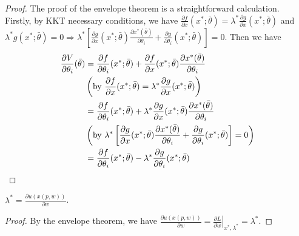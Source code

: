 \documentclass[11pt]{elegantbook}
\begin{document}
\begin{proof}
    The proof of the envelope theorem is a straightforward calculation.\\
    Firstly, by KKT necessary conditions, we have $\frac{\partial f}{\partial x}(x^*;\bar{\theta})=\lambda^* \frac{\partial g}{\partial x}(x^*;\bar{\theta})$ and $\lambda^* g(x^*;\bar{\theta})=0 \Rightarrow \lambda^*\left[\frac{\partial g}{\partial x}(x^*;\bar{\theta})\frac{\partial x^*(\bar{\theta})}{\partial \theta_i}+\frac{\partial g}{\partial \theta_i}(x^*;\bar{\theta})\right]=0$. Then we have
    \begin{equation}
        \begin{aligned}
            \frac{\partial V}{\partial \theta_i}(\bar{\theta})&=\frac{\partial f}{\partial \theta_i}(x^*;\bar{\theta})+\frac{\partial f}{\partial x}(x^*;\bar{\theta})\frac{\partial x^*(\bar{\theta})}{\partial \theta_i}\\
            &\left(\textnormal{by }\frac{\partial f}{\partial x}(x^*;\bar{\theta})=\lambda^* \frac{\partial g}{\partial x}(x^*;\bar{\theta})\right)\\
            &=\frac{\partial f}{\partial \theta_i}(x^*;\bar{\theta})+\lambda^* \frac{\partial g}{\partial x}(x^*;\bar{\theta})\frac{\partial x^*(\bar{\theta})}{\partial \theta_i}\\
            &\left(\textnormal{by }\lambda^*\left[\frac{\partial g}{\partial x}(x^*;\bar{\theta})\frac{\partial x^*(\bar{\theta})}{\partial \theta_i}+\frac{\partial g}{\partial \theta_i}(x^*;\bar{\theta})\right]=0\right)\\
            &=\frac{\partial f}{\partial \theta_i}(x^{*};\bar{\theta})-\lambda^*\frac{\partial g}{\partial \theta_i}(x^{*};\bar{\theta})
        \end{aligned}
        \nonumber
    \end{equation}
\end{proof}

\begin{corollary}\label{corollary:marginal_wealth}
    $\lambda^{*}=\frac{\partial u(x(p, w))}{\partial w}$.
\end{corollary}
\begin{proof}
    By the envelope theorem, we have $\frac{\partial u(x(p, w))}{\partial w}=\left.\frac{\partial L}{\partial w}\right|_{x^{*}, \lambda^{*}}=\lambda^{*}$.
\end{proof}
\end{document}
